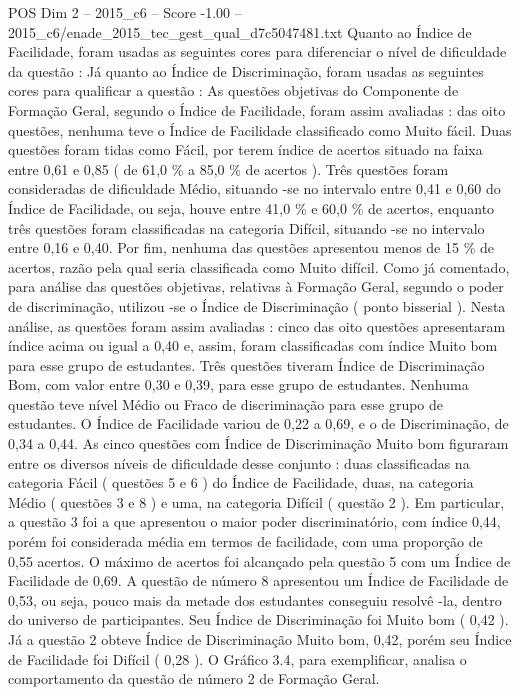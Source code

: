\begin{textsample}{POS Dim 2 – 2015\_c6 – Score -1.00 – 2015\_c6/enade\_2015\_tec\_gest\_qual\_d7c5047481.txt}
Quanto ao Índice de Facilidade, foram usadas as seguintes cores para diferenciar o nível de dificuldade da questão : Já quanto ao Índice de Discriminação, foram usadas as seguintes cores para qualificar a questão : As questões objetivas do Componente de Formação Geral, segundo o Índice de Facilidade, foram assim avaliadas : das oito questões, nenhuma teve o Índice de Facilidade classificado como Muito fácil.
Duas questões foram tidas como Fácil, por terem índice de acertos situado na faixa entre 0,61 e 0,85 ( de 61,0 \% a 85,0 \% de acertos ).
Três questões foram consideradas de dificuldade Médio, situando -se no intervalo entre 0,41 e 0,60 do Índice de Facilidade, ou seja, houve entre 41,0 \% e 60,0 \% de acertos, enquanto três questões foram classificadas na categoria Difícil, situando -se no intervalo entre 0,16 e 0,40.
Por fim, nenhuma das questões apresentou menos de 15 \% de acertos, razão pela qual seria classificada como Muito difícil.
Como já comentado, para análise das questões objetivas, relativas à Formação Geral, segundo o poder de discriminação, utilizou -se o Índice de Discriminação ( ponto bisserial ).
Nesta análise, as questões foram assim avaliadas : cinco das oito questões apresentaram índice acima ou igual a 0,40 e, assim, foram classificadas com índice Muito bom para esse grupo de estudantes.
Três questões tiveram Índice de Discriminação Bom, com valor entre 0,30 e 0,39, para esse grupo de estudantes.
Nenhuma questão teve nível Médio ou Fraco de discriminação para esse grupo de estudantes.
O Índice de Facilidade variou de 0,22 a 0,69, e o de Discriminação, de 0,34 a 0,44.
As cinco questões com Índice de Discriminação Muito bom figuraram entre os diversos níveis de dificuldade desse conjunto : duas classificadas na categoria Fácil ( questões 5 e 6 ) do Índice de Facilidade, duas, na categoria Médio ( questões 3 e 8 ) e uma, na categoria Difícil ( questão 2 ).
Em particular, a questão 3 foi a que apresentou o maior poder discriminatório, com índice 0,44, porém foi considerada média em termos de facilidade, com uma proporção de 0,55 acertos.
O máximo de acertos foi alcançado pela questão 5 com um Índice de Facilidade de 0,69.
A questão de número 8 apresentou um Índice de Facilidade de 0,53, ou seja, pouco mais da metade dos estudantes conseguiu resolvê -la, dentro do universo de participantes.
Seu Índice de Discriminação foi Muito bom ( 0,42 ).
Já a questão 2 obteve Índice de Discriminação Muito bom, 0,42, porém seu Índice de Facilidade foi Difícil ( 0,28 ).
O Gráfico 3.4, para exemplificar, analisa o comportamento da questão de número 2 de Formação Geral.

\end{textsample}
